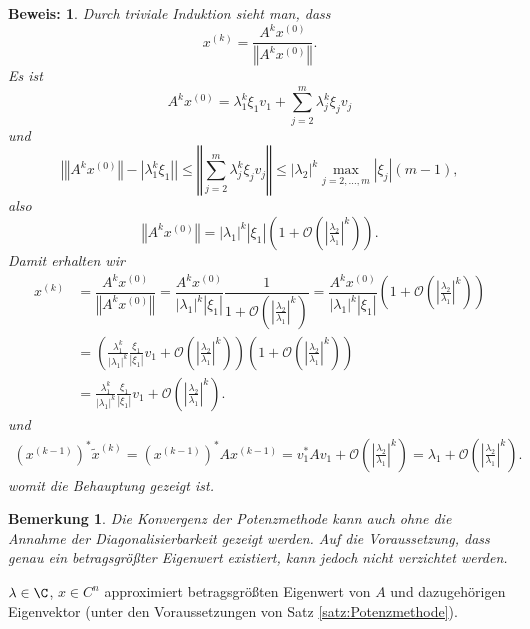 \documentclass[
]{mycourse}
\theoremstyle{mythm}
\newtheorem{bemerkung}[theorem]{Bemerkung}
\theoremstyle{break}
\newtheorem*{beweis}{Beweis:}
\newcommand{\norm}[1]{\left\Vert#1\right\Vert}		%
\begin{document}
\begin{beweis}
Durch triviale Induktion sieht man, dass
\[
x^{(k)}=\frac{A^{k}x^{(0)}}{\norm{A^{k}x^{(0)}}}.
\]
Es ist 
\[
A^{k}x^{(0)}=\lambda_1^k \xi_1 v_1 + \sum_{j=2}^m \lambda_j^k \xi_j v_j
\]
und 
\[
\left| \norm{A^{k}x^{(0)}}- |\lambda_1^k \xi_1| \right| \leq \norm{\sum_{j=2}^m \lambda_j^k \xi_j v_j}
\leq |\lambda_2|^k \max_{j=2,\dotsc,m} |\xi_j| (m-1),
\]
also 
\[
\norm{A^{k}x^{(0)}}=|\lambda_1|^k |\xi_1| \left( 1 + \mathcal O(\left| \tfrac {\lambda_2}  {\lambda_1}\right|^{k})\right).
\]
Damit erhalten wir
\begin{align*}
x^{(k)}
&=\dfrac{A^{k}x^{(0)}}{\norm{A^{k}x^{(0)}}}
=\dfrac{A^{k}x^{(0)}}{|\lambda_1|^k |\xi_1|} \dfrac{1}{1 + \mathcal O(\left| \tfrac {\lambda_2}  {\lambda_1}\right|^{k})}
=\dfrac{A^{k}x^{(0)}}{|\lambda_1|^k |\xi_1|} \left( 1 + \mathcal O(\left| \tfrac {\lambda_2}  {\lambda_1}\right|^{k})\right)\\
&= \left( \frac{\lambda_1^k}{|\lambda_1|^k} \frac{\xi_1}{|\xi_1|} v_1 + \mathcal O(\left| \tfrac {\lambda_2}  {\lambda_1}\right|^{k}) \right)
 \left( 1 + \mathcal O(\left| \tfrac {\lambda_2}  {\lambda_1}\right|^{k})\right)\\
&=\frac{\lambda_1^k}{|\lambda_1|^k} \frac{\xi_1}{|\xi_1|} v_1 + \mathcal O(\left| \tfrac {\lambda_2}  {\lambda_1}\right|^{k}).
\end{align*}
und %
\begin{align*}
(x^{(k-1)})^* \tilde x^{(k)}= (x^{(k-1)})^* A x^{(k-1)} = v_1^* A v_1 + \mathcal O(\left| \tfrac {\lambda_2}  {\lambda_1}\right|^{k})
= \lambda_1 + \mathcal O(\left| \tfrac {\lambda_2}  {\lambda_1}\right|^{k}).
\end{align*}
womit die Behauptung gezeigt ist.
\end{beweis}

\begin{bemerkung}
Die Konvergenz der Potenzmethode kann auch ohne die Annahme der Diagonalisierbarkeit gezeigt werden. Auf die Voraussetzung, 
dass genau ein \emph{betragsgrößter} Eigenwert existiert, kann jedoch nicht verzichtet werden.
\end{bemerkung}

\begin{alg}
\label{algo:Potenzmethode}
\begin{algorithmic}
\Repeat
{}
\State{$x:=\tilde x / \norm{\tilde x}$}
\State \Return $\lambda\in \C$, $x\in C^n$ approximiert betragsgrößten Eigenwert von $A$ und dazugehörigen Eigenvektor (unter den Voraussetzungen von Satz 
\ref{satz:Potenzmethode}).
\end{algorithmic}
\end{alg}
\end{document}
